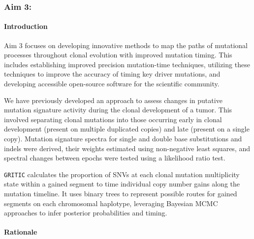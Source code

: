 \subsubsection{Aim 3: \SpecificAimThree}

\paragraph{Introduction}

Aim 3 focuses on developing innovative methods to map the paths of mutational processes 
throughout clonal evolution with improved mutation timing. 
This includes establishing improved precision mutation-time techniques, 
utilizing these techniques to improve the accuracy of timing key driver mutations, 
and developing accessible open-source software for the scientific community.

\vspace{1em}
\noindent
We have previously developed an approach to assess changes in putative mutation signature activity during the clonal development of a tumor. 
This involved separating clonal mutations into those occurring early in clonal development 
(present on multiple duplicated copies) and late (present on a single copy). 
Mutation signature spectra for single and double base substitutions and indels were derived, 
their weights estimated using non-negative least squares, and spectral changes between epochs were tested using a likelihood ratio test. 

\vspace{1em}
\noindent
\texttt{GRITIC} calculates the proportion of SNVs at each clonal mutation multiplicity state within a gained segment to 
time individual copy number gains along the mutation timeline. 
It uses binary trees to represent possible routes for gained segments on each chromosomal haplotype, 
leveraging Bayesian MCMC approaches to infer posterior probabilities and timing.


\paragraph{Rationale}

